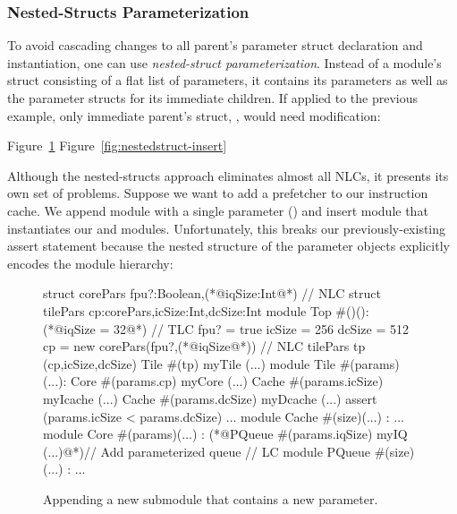 \subsubsection{Nested-Structs Parameterization}

To avoid cascading changes to all parent's parameter struct declaration and instantiation, one can use \emph{nested-struct parameterization}. Instead of a module's struct consisting of a flat list of parameters, it contains its parameters as well as the parameter structs for its immediate children. If applied to the previous example, only  immediate parent's struct, , would need modification:

Figure~\ref{fig:nestedstruct-append}
Figure~\ref{fig:nestedstruct-insert}

Although the nested-structs approach eliminates almost all NLCs, it presents its own set of problems. 
Suppose we want to add a prefetcher to our instruction cache. 
We append module  with a single parameter () and insert module  that instantiates our  and  modules. 
Unfortunately, this breaks our previously-existing assert statement because the nested structure of the parameter objects explicitly encodes the module hierarchy:

\begin{figure}
\centering
\begin{phdl}
struct corePars {fpu?:Boolean,(*@\textcolor[rgb]{1,0,0}{iqSize:Int}@*)}                        // NLC
struct tilePars {cp:corePars,icSize:Int,dcSize:Int}
module Top #()():
  (*@\textcolor[rgb]{1,0,0}{iqSize = 32}@*)                                                    // TLC
  fpu? = true
  icSize = 256
  dcSize = 512
  cp = new corePars(fpu?,(*@\textcolor[rgb]{1,0,0}{iqSize}@*))                                 // NLC
  tilePars tp (cp,icSize,dcSize)
  Tile #(tp) myTile (...)
module Tile #(params)(...):
  Core  #(params.cp)  myCore   (...)
  Cache #(params.icSize) myIcache (...)
  Cache #(params.dcSize) myDcache (...)
  assert (params.icSize < params.dcSize) ...
module Cache #(size)(...) : ...
module Core #(params)(...) :
    (*@\textcolor[rgb]{1,0,0}{PQueue \#(params.iqSize) myIQ (...)}@*)// Add parameterized queue // LC
module PQueue #(size)(...) : ...
\end{phdl} 
\caption{Appending a new submodule that contains a new parameter.}
\label{fig:nestedstruct-append}
\end{figure}

